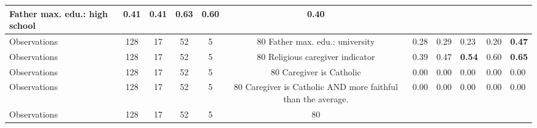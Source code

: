 \begin{tabular}{l c c c c c c }
Father max. edu.: high school &      0.41 &      0.41 & \textbf{     0.63} &      0.60 &      0.40 \\
\midrule
Observations &       128 &        17 &        52 &         5 &        80
Father max. edu.: university &      0.28 &      0.29 &      0.23 &      0.20 & \textbf{     0.47} \\
\midrule
Observations &       128 &        17 &        52 &         5 &        80
Religious caregiver indicator &      0.39 &      0.47 & \textbf{     0.54} &      0.60 & \textbf{     0.65} \\
\midrule
Observations &       128 &        17 &        52 &         5 &        80
Caregiver is Catholic &      0.00 &      0.00 &      0.00 &      0.00 &      0.00 \\
\midrule
Observations &       128 &        17 &        52 &         5 &        80
Caregiver is Catholic AND more faithful than the average. &      0.00 &      0.00 &      0.00 &      0.00 &      0.00 \\
\midrule
Observations &       128 &        17 &        52 &         5 &        80
\bottomrule
\end{tabular}
